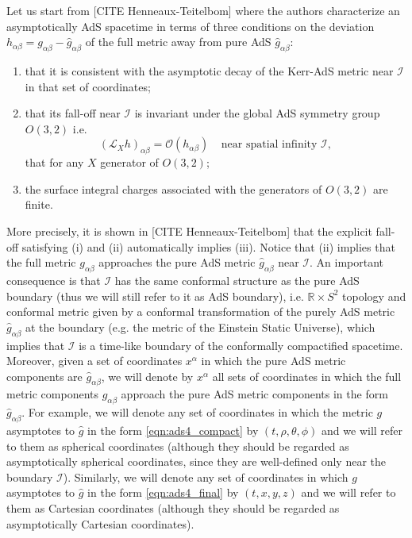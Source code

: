 \documentclass[a4paper,11pt]{article}
\begin{document}
Let us start from [CITE Henneaux-Teitelbom] where the authors characterize an asymptotically AdS spacetime in terms of three conditions on the deviation $h_{\alpha\beta}=g_{\alpha\beta}-\hat{g}_{\alpha\beta}$ of the full metric away from pure AdS $\hat{g}_{\alpha\beta}$:
\begin{enumerate}
\item that it is consistent with the asymptotic decay of the Kerr-AdS metric near $\mathcal{I}$ in that set of coordinates;
\item that its fall-off near $\mathcal{I}$ is invariant under the global AdS symmetry group $O(3,2)$ i.e.
\begin{equation}\label{eqn:asyKilleq}
(\mathcal{L}_X h)_{\alpha\beta}=\mathcal{O}(h_{\alpha\beta})\;\;\;\; \textrm{near spatial infinity $\mathcal{I}$},
\end{equation}
that for any $X$ generator of $O(3,2)$;
\item the surface integral charges associated with the generators of $O(3,2)$ are finite.
\end{enumerate}
More precisely, it is shown in [CITE Henneaux-Teitelbom] that the explicit fall-off satisfying (i) and (ii) automatically implies (iii).
Notice that (ii) implies that the full metric $g_{\alpha\beta}$ approaches the pure AdS metric $\hat{g}_{\alpha\beta}$ near $\mathcal{I}$. An important consequence is that $\mathcal{I}$ has the same conformal structure as the pure AdS boundary (thus we will still refer to it as AdS boundary), i.e. $\mathbb{R}\times S^2$ topology and conformal metric given by a conformal transformation of the purely AdS metric $\hat{g}_{\alpha\beta}$ at the boundary (e.g. the metric of the Einstein Static Universe), which implies that $\mathcal{I}$ is a time-like boundary of the conformally compactified spacetime. Moreover, given a set of coordinates $x^\alpha$ in which the pure AdS metric components are $\hat{g}_{\alpha\beta}$, we will denote by $x^\alpha$ all sets of coordinates in which the full metric components $g_{\alpha\beta}$ approach the pure AdS metric components in the form $\hat{g}_{\alpha\beta}$. For example, we will denote any set of coordinates in which the metric $g$ asymptotes to $\hat{g}$ in the form \eqref{eqn:ads4_compact} by $(t,\rho,\theta,\phi)$ and we will refer to them as spherical coordinates (although they should be regarded as asymptotically spherical coordinates, since they are well-defined only near the boundary $\mathcal{I}$). Similarly, we will denote any set of coordinates in which $g$ asymptotes to $\hat{g}$ in the form \eqref{eqn:ads4_final} by $(t,x,y,z)$ and we will refer to them as Cartesian coordinates (although they should be regarded as asymptotically Cartesian coordinates).
\end{document}
